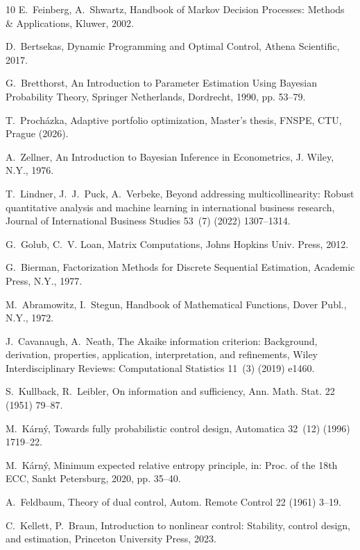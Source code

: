 \documentclass[final,3p,times,twocolumn]{elsarticle}
\begin{document}
\begin{thebibliography}{10}
E.~Feinberg, A.~Shwartz, Handbook of Markov Decision Processes: {Me}thods \&
  Applications, Kluwer, 2002.

D.~Bertsekas, Dynamic Programming and Optimal Control, Athena Scientific, 2017.

G.~Bretthorst, An Introduction to Parameter Estimation Using {B}ayesian
  Probability Theory, Springer Netherlands, Dordrecht, 1990, pp. 53--79.

T.~Proch\'{a}zka, Adaptive portfolio optimization, Master's thesis,
  FNSPE, CTU, Prague (2026).

A.~Zellner, An Introduction to {B}ayesian Inference in Econometrics, J. Wiley,
  N.Y., 1976.

T.~Lindner, J.~J.~Puck, A.~Verbeke, Beyond addressing multicollinearity:
  {R}obust quantitative analysis and machine learning in international business
  research, Journal of International Business Studies 53~(7) (2022) 1307--1314.

G.~Golub, C.~V. Loan, Matrix Computations, Johns Hopkins Univ. Press, 2012.

G.~Bierman, Factorization Methods for Discrete Sequential Estimation, Academic
  Press, N.Y., 1977.

M.~Abramowitz, I.~Stegun, Handbook of Mathematical Functions, Dover Publ.,
  N.Y., 1972.

J.~Cavanaugh, A.~Neath, The {A}kaike information criterion: {B}ackground,
  derivation, properties, application, interpretation, and refinements, Wiley
  Interdisciplinary Reviews: Computational Statistics 11~(3) (2019) e1460.

S.~Kullback, R.~Leibler, On information and sufficiency, Ann. Math. Stat. 22
  (1951) 79--87.

M.~K\'{a}rn\'{y}, Towards fully probabilistic control design, Automatica
  32~(12) (1996) 1719--22.

M.~K\'{a}rn\'{y}, Minimum expected relative entropy principle, in: Proc. of the
  18th ECC, Sankt Petersburg, 2020, pp. 35--40.

A.~Feldbaum, Theory of dual control, Autom. Remote Control 22 (1961) 3--19.

C.~Kellett, P.~Braun, Introduction to nonlinear control: {S}tability, control
  design, and estimation, Princeton University Press, 2023.


\end{thebibliography}
\end{document}
